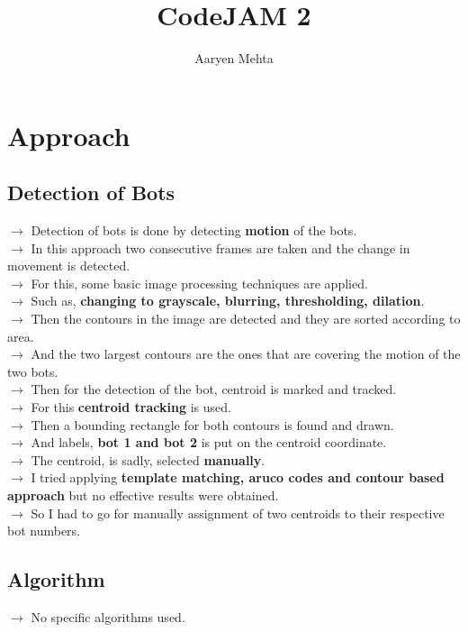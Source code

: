 \documentclass{article}
\title{CodeJAM 2}
\author{Aaryen Mehta}
\date{}
\begin{document}
\maketitle

\section*{Approach}

\subsection*{Detection of Bots}
$\rightarrow$ Detection of bots is done by detecting \textbf{motion} of the bots.\\
$\rightarrow$ In this approach two consecutive frames are taken and the change in movement is detected.\\
$\rightarrow$ For this, some basic image processing techniques are applied.\\
$\rightarrow$ Such as, \textbf{changing to grayscale, blurring, thresholding, dilation}.\\
$\rightarrow$ Then the contours in the image are detected and they are sorted according to area.\\
$\rightarrow$ And the two largest contours are the ones that are covering the motion of the two bots.\\
$\rightarrow$ Then for the detection of the bot, centroid is marked and tracked.\\
$\rightarrow$ For this \textbf{centroid tracking} is used.\\
$\rightarrow$ Then a bounding rectangle for both contours is found and drawn.\\
$\rightarrow$ And labels, \textbf{bot 1 and bot 2} is put on the centroid coordinate.\\
$\rightarrow$ The centroid, is sadly, selected \textbf{manually}.\\
$\rightarrow$ I tried applying \textbf{template matching, aruco codes and contour based approach} but no effective results were obtained.\\
$\rightarrow$ So I had to go for manually assignment of two centroids to their respective bot numbers.\\

\subsection*{Algorithm}
$\rightarrow$ No specific algorithms used. 
\end{document}
